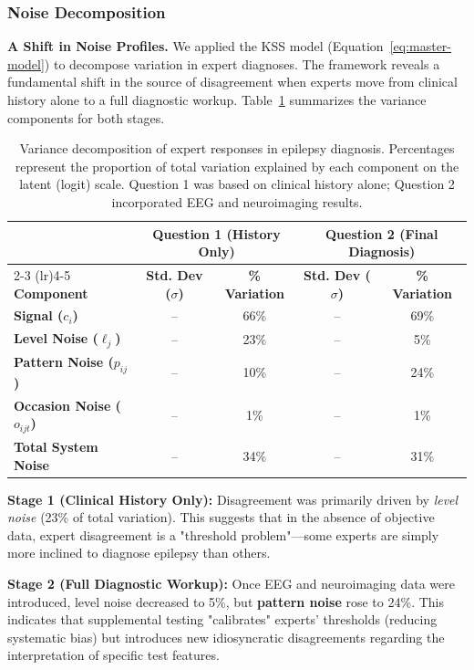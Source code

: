\subsubsection*{Noise Decomposition}

\textbf{A Shift in Noise Profiles.} We applied the KSS model (Equation~\ref{eq:master-model}) to decompose variation in expert diagnoses. The framework reveals a fundamental shift in the source of disagreement when experts move from clinical history alone to a full diagnostic workup. Table~\ref{tab:variance-results} summarizes the variance components for both stages.

\begin{table}[h!]
\centering
\small
\begin{tabular}{lcccc}
\toprule
& \multicolumn{2}{c}{\textbf{Question 1 (History Only)}} & \multicolumn{2}{c}{\textbf{Question 2 (Final Diagnosis)}} \\
\cmidrule(lr){2-3} \cmidrule(lr){4-5}
\textbf{Component} & \textbf{Std. Dev ($\sigma$)} & \textbf{\% Variation} & \textbf{Std. Dev ($\sigma$)} & \textbf{\% Variation} \\
\midrule
\textbf{Signal ($c_i$)} & -- & 66\% & -- & 69\%  \\
\textbf{Level Noise ($\ell_j$)} & -- & 23\% & -- & 5\%  \\
\textbf{Pattern Noise ($p_{ij}$)} & -- & 10\% & -- & 24\%  \\
\textbf{Occasion Noise ($o_{ijt}$)} & -- & 1\% & -- & 1\%  \\
\midrule
\textbf{Total System Noise} & -- & 34\% & -- & 31\%  \\
\bottomrule
\end{tabular}
\caption{Variance decomposition of expert responses in epilepsy diagnosis. Percentages represent the proportion of total variation explained by each component on the latent (logit) scale. Question 1 was based on clinical history alone; Question 2 incorporated EEG and neuroimaging results.}
\label{tab:variance-results}
\end{table}

\textbf{Stage 1 (Clinical History Only):} Disagreement was primarily driven by \textit{level noise} (23\% of total variation). This suggests that in the absence of objective data, expert disagreement is a "threshold problem"---some experts are simply more inclined to diagnose epilepsy than others. 

\textbf{Stage 2 (Full Diagnostic Workup):} Once EEG and neuroimaging data were introduced, level noise decreased to 5\%, but \textbf{pattern noise} rose to 24\%. This indicates that supplemental testing "calibrates" experts' thresholds (reducing systematic bias) but introduces new idiosyncratic disagreements regarding the interpretation of specific test features. 

